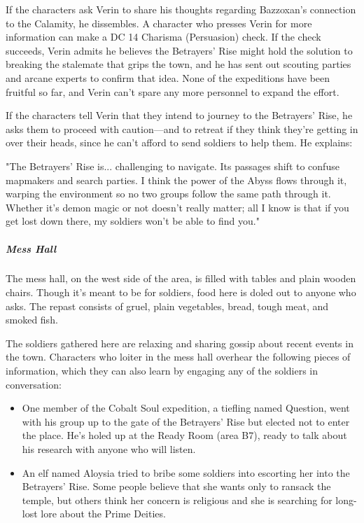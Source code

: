 \documentclass[10pt,a4paper,twoside,fancy,bg=print,twocolumn,openany,nodeprecatedcode]{dndbook}
\begin{document}
If the characters ask Verin to share his thoughts regarding Bazzoxan's connection to the Calamity, he dissembles. A character who presses Verin for more information can make a DC 14 Charisma (Persuasion) check. If the check succeeds, Verin admits he believes the Betrayers' Rise might hold the solution to breaking the stalemate that grips the town, and he has sent out scouting parties and arcane experts to confirm that idea. None of the expeditions have been fruitful so far, and Verin can't spare any more personnel to expand the effort.

If the characters tell Verin that they intend to journey to the Betrayers' Rise, he asks them to proceed with caution—and to retreat if they think they're getting in over their heads, since he can't afford to send soldiers to help them. He explains:

\begin{DndReadAloud}{}
"The Betrayers' Rise is... challenging to navigate. Its passages shift to confuse mapmakers and search parties. I think the power of the Abyss flows through it, warping the environment so no two groups follow the same path through it. Whether it's demon magic or not doesn't really matter; all I know is that if you get lost down there, my soldiers won't be able to find you."

\end{DndReadAloud}

\subparagraph{Mess Hall}
The mess hall, on the west side of the area, is filled with tables and plain wooden chairs. Though it's meant to be for soldiers, food here is doled out to anyone who asks. The repast consists of gruel, plain vegetables, bread, tough meat, and smoked fish.

The soldiers gathered here are relaxing and sharing gossip about recent events in the town. Characters who loiter in the mess hall overhear the following pieces of information, which they can also learn by engaging any of the soldiers in conversation:


\begin{itemize}
\item One member of the Cobalt Soul expedition, a tiefling named Question, went with his group up to the gate of the Betrayers' Rise but elected not to enter the place. He's holed up at the Ready Room (area B7), ready to talk about his research with anyone who will listen.
\item An elf named Aloysia tried to bribe some soldiers into escorting her into the Betrayers' Rise. Some people believe that she wants only to ransack the temple, but others think her concern is religious and she is searching for long-lost lore about the Prime Deities.
\end{itemize}
\end{document}
